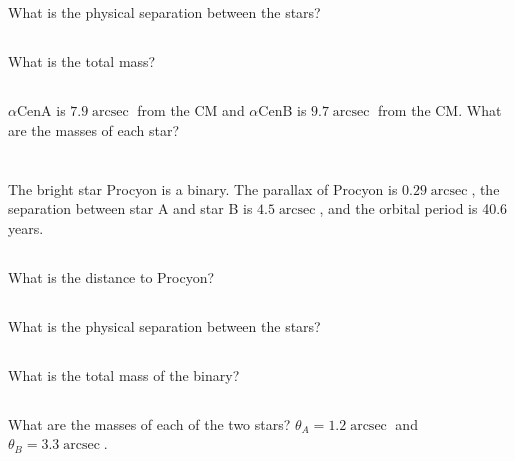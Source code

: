 \documentclass[11pt]{scrartcl}
\DeclareMathOperator{\arcsec}{arcsec}
\begin{document}
\subsection{}

What is the physical separation between the stars?

\subsection{}

What is the total mass?

\subsection{}

$\alpha$CenA is $7.9\arcsec$ from the CM and $\alpha$CenB is $9.7 \arcsec$ from the CM. What are the masses of each star?


\section{}

The bright star Procyon is a binary. The parallax of Procyon is $0.29\arcsec$, the separation between star A and star B is $4.5 \arcsec$, and the orbital period is 40.6 years.

\subsection{}

What is the distance to Procyon?

\subsection{}

What is the physical separation between the stars?

\subsection{}

What is the total mass of the binary?

\subsection{}

What are the masses of each of the two stars? $\theta_A = 1.2\arcsec$ and $\theta_B = 3.3\arcsec$.
\end{document}
